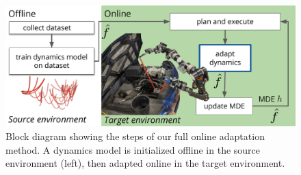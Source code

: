 \begin{figure}
    \centering
    \includegraphics[width=1\linewidth]{Chap4/images/overview_diagram.pdf}
    \caption{Block diagram showing the steps of our full online adaptation method. A dynamics model is initialized offline in the source environment (left), then adapted online in the target environment.}
    \label{ICRA:fig:diagram}
\end{figure}
